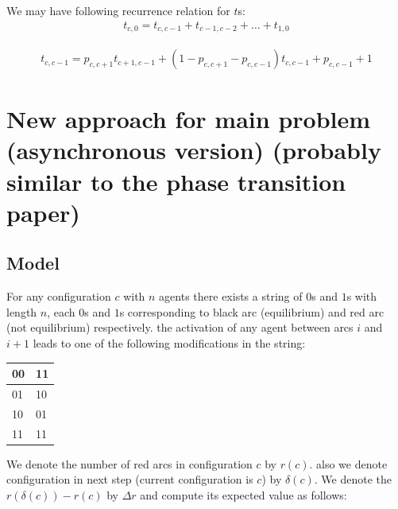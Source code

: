 \documentclass[]{book}
\theoremstyle{definition}
\begin{document}
 We may have following recurrence relation for $t$s:
\begin{equation}
\begin{split}
    t_{c, 0} = t_{c, c-1} + t_{c-1, c-2} + \hdots + t_{1, 0}
\end{split}
\end{equation}

\begin{equation}
\begin{split}
    t_{c, c-1} = p_{c, c+1} t_{c+1, c-1} + \left( 1 - p_{c, c+1} - p_{c, c-1} \right) t_{c, c-1} + p_{c, c-1} + 1
\end{split}
\end{equation}


\section{New approach for main problem (asynchronous version) (probably similar to the phase transition paper)}
\subsection{Model}
For any configuration \emph{$c$} with $n$ agents there exists a string of $0$s and $1$s with length $n$, each $0$s and $1$s corresponding to black arc (equilibrium) and red arc (not equilibrium) respectively.
the activation of any agent between arcs $i$ and $i+1$ leads to one of the following modifications in the string:
\begin{center}
    \begin{table}[ht]
        \begin{tabular}{|l|l|}
        \hline
        00 & 11 \\ \hline
        01 & 10 \\ \hline
        10 & 01 \\ \hline
        11 & 11 \\ \hline
        \end{tabular}
    \end{table}
\end{center}

We denote the number of red arcs in configuration $c$ by $r(c)$. also we denote configuration in next step (current configuration is $c$) by $\delta(c)$.
We denote the $r(\delta(c)) - r(c)$ by $\Delta r$ and compute its expected value as follows:
\end{document}
